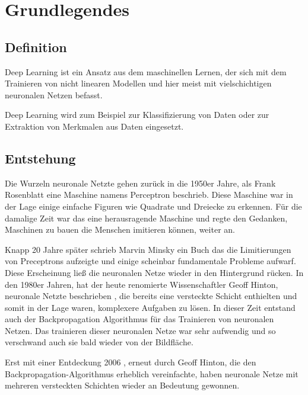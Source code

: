 \chapter{Grundlegendes}
\label{cha:grundlegendes}

\section{Definition}

Deep Learning ist ein Ansatz aus dem maschinellen Lernen, der sich mit dem Trainieren von nicht linearen Modellen und hier meist mit vielschichtigen neuronalen Netzen befasst. 

Deep Learning wird zum Beispiel zur Klassifizierung von Daten oder zur Extraktion von Merkmalen aus Daten eingesetzt.

\section{Entstehung}
\label{cha:entstehung}

Die Wurzeln neuronale Netzte gehen zurück in die 1950er Jahre, als Frank Rosenblatt eine Maschine namens Perceptron \citep{Perceptron} beschrieb. Diese Maschine war in der Lage einige einfache Figuren wie Quadrate und Dreiecke zu erkennen. Für die damalige Zeit war das eine herausragende Maschine und regte den Gedanken, Maschinen zu bauen die Menschen imitieren können, weiter an.

Knapp 20 Jahre später schrieb Marvin Minsky \citep{PerceptronsMinsky} ein Buch das die Limitierungen von Preceptrons aufzeigte und einige scheinbar fundamentale Probleme aufwarf. Diese Erscheinung ließ die neuronalen Netze wieder in den Hintergrund rücken.
In den 1980er Jahren, hat der heute renomierte Wissenschaftler Geoff Hinton, neuronale Netzte beschrieben \citep{BackpropagationEarly}, die bereits eine versteckte Schicht enthielten und somit in der Lage waren, komplexere Aufgaben zu lösen. In dieser Zeit entstand auch der Backpropagation Algorithmus für das Trainieren von neuronalen Netzen. %
Das trainieren dieser neuronalen Netze war sehr aufwendig und so verschwand auch sie bald wieder von der Bildfläche. 

Erst mit einer Entdeckung 2006 \citep{BackpropagationFast}, erneut durch Geoff Hinton, die den Backpropagation-Algorithmus erheblich vereinfachte, haben neuronale Netze mit mehreren versteckten Schichten wieder an Bedeutung gewonnen. 

